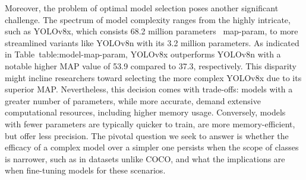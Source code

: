 Moreover, the problem of optimal model selection poses another significant challenge. The spectrum of model complexity ranges from the highly intricate, such as YOLOv8x, which consists 68.2 million parameters ~{map-param}, to more streamlined variants like YOLOv8n with its 3.2 million parameters. As indicated in Table~{table:model-map-param}, YOLOv8x outperforms YOLOv8n with a notable higher MAP value of 53.9 compared to 37.3, respectively. This disparity might incline researchers toward selecting the more complex YOLOv8x due to its superior MAP. Nevertheless, this decision comes with trade-offs: models with a greater number of parameters, while more accurate, demand extensive computational resources, including higher memory usage. Conversely, models with fewer parameters are typically quicker to train, are more memory-efficient, but offer less precision. The pivotal question we seek to answer is whether the efficacy of a complex model over a simpler one persists when the scope of classes is narrower, such as in datasets unlike COCO, and what the implications are when fine-tuning models for these scenarios.
